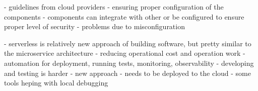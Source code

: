 \label{chapter:serverless-suitability-security-and-compliance}
- guidelines from cloud providers - ensuring proper configuration of the components
- components can integrate with other or be configured to ensure proper level of security
- problems due to misconfiguration

\label{chapter:serverless-suitability-maintainability}
- serverless is relatively new approach of building software, but pretty similar to the microservice architecture
- reducing operational cost and operation work
- automation for deployment, running tests, monitoring, observability
- developing and testing is harder - new approach - needs to be deployed to the cloud - some tools heping with local debugging